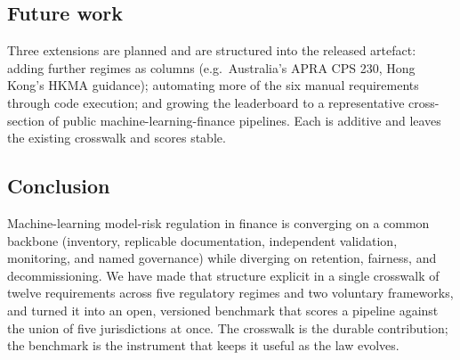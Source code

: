 \subsection{Future work}\label{sec:future}

Three extensions are planned and are structured into the released artefact: adding further regimes as columns (e.g.\ Australia's APRA CPS 230, Hong Kong's HKMA guidance); automating more of the six manual requirements through code execution; and growing the leaderboard to a representative cross-section of public machine-learning-finance pipelines. Each is additive and leaves the existing crosswalk and scores stable.

\subsection{Conclusion}\label{sec:conclusion}

Machine-learning model-risk regulation in finance is converging on a common backbone (inventory, replicable documentation, independent validation, monitoring, and named governance) while diverging on retention, fairness, and decommissioning. We have made that structure explicit in a single crosswalk of twelve requirements across five regulatory regimes and two voluntary frameworks, and turned it into an open, versioned benchmark that scores a pipeline against the union of five jurisdictions at once. The crosswalk is the durable contribution; the benchmark is the instrument that keeps it useful as the law evolves.
